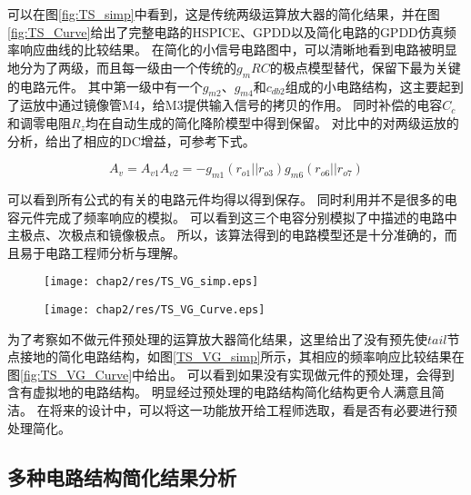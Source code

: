 可以在图\ref{fig:TS_simp}中看到，这是传统两级运算放大器的简化结果，并在图\ref{fig:TS_Curve}给出了完整电路的HSPICE、GPDD以及简化电路的GPDD仿真频率响应曲线的比较结果。
在简化的小信号电路图中，可以清晰地看到电路被明显地分为了两级，而且每一级由一个传统的$g_m R C$的极点模型替代，保留下最为关键的电路元件。
其中第一级中有一个$g_{m2}$、$g_{m4}$和$c_{db2}$组成的小电路结构，这主要起到了运放中通过镜像管M4，给M3提供输入信号的拷贝的作用。
同时补偿的电容$C_c$和调零电阻$R_z$均在自动生成的简化降阶模型中得到保留。
对比\parencite{GRAY-Analog}中的对两级运放的分析，给出了相应的DC增益，可参考下式。

\begin{equation}
{A_v} = {A_{v1}}{A_{v2}} =  - {g_{m1}}\left( {{r_{o1}}||{r_{o3}}} \right){g_{m6}}\left( {{r_{o6}}||{r_{o7}}} \right)
\end{equation}

可以看到所有公式的有关的电路元件均得以得到保存。
同时利用并不是很多的电容元件完成了频率响应的模拟。
可以看到这三个电容分别模拟了\parencite{Allen-Analog}中描述的电路中主极点、次极点和镜像极点。
所以，该算法得到的电路模型还是十分准确的，而且易于电路工程师分析与理解。

\begin{figure}[!htp]
	\centering
	\texttt{[image: chap2/res/TS\_VG\_simp.eps]}
\end{figure}

\begin{figure}[!htp]
	\centering
	\texttt{[image: chap2/res/TS\_VG\_Curve.eps]}
\end{figure}

为了考察如不做元件预处理的运算放大器简化结果，这里给出了没有预先使$tail$节点接地的简化电路结构，如图\ref{TS_VG_simp}所示，其相应的频率响应比较结果在图\ref{fig:TS_VG_Curve}中给出。
可以看到如果没有实现做元件的预处理，会得到含有虚拟地的电路结构。
明显经过预处理的电路结构简化结构更令人满意且简洁。
在将来的设计中，可以将这一功能放开给工程师选取，看是否有必要进行预处理简化。

\subsection{多种电路结构简化结果分析}
\label{subsec:simp:res:cir}

